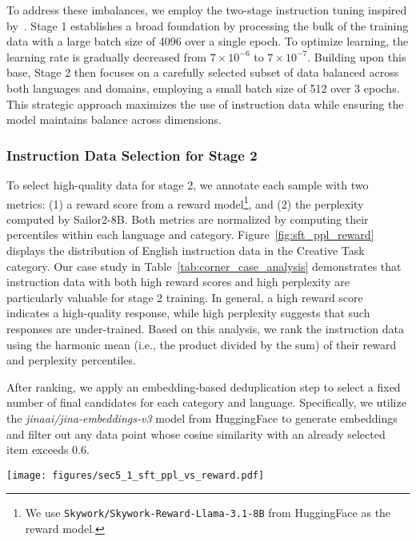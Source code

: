 To address these imbalances, we employ the two-stage instruction tuning inspired by~\cite{Huang2024OpenCoderTO}. 
Stage 1 establishes a broad foundation by processing the bulk of the training data with a large batch size of 4096 over a single epoch. 
To optimize learning, the learning rate is gradually decreased from $7 \times 10^{-6}$ to $7 \times 10^{-7}$.
Building upon this base, Stage 2 then focuses on a carefully selected subset of data balanced across both languages and domains, employing a small batch size of 512 over 3 epochs. 
This strategic approach maximizes the use of instruction data while ensuring the model maintains balance across dimensions.


\subsubsection{Instruction Data Selection for Stage 2}
To select high-quality data for stage 2, we annotate each sample with two metrics: (1) a reward score from a reward model\footnote{We use \texttt{Skywork/Skywork-Reward-Llama-3.1-8B} from HuggingFace as the reward model.}, and (2) the perplexity computed by Sailor2-8B. 
Both metrics are normalized by computing their percentiles within each language and category. Figure~\ref{fig:sft_ppl_reward} displays the distribution of English instruction data in the Creative Task category. Our case study in Table~\ref{tab:corner_case_analysis} demonstrates that instruction data with both high reward scores and high perplexity are particularly valuable for stage 2 training. 
In general, a high reward score indicates a high-quality response, while high perplexity suggests that such responses are under-trained. Based on this analysis, we rank the instruction data using the harmonic mean (i.e., the product divided by the sum) of their reward and perplexity percentiles.

After ranking, we apply an embedding-based deduplication step to select a fixed number of final candidates for each category and language. Specifically, we utilize the \textit{jinaai/jina-embeddings-v3} model from HuggingFace to generate embeddings and filter out any data point whose cosine similarity with an already selected item exceeds 0.6.





\begin{figure*}
\centering
\begin{minipage}[b]{\textwidth}
\centering
\texttt{[image: figures/sec5\_1\_sft\_ppl\_vs\_reward.pdf]}
\end{minipage}
\label{fig:sft_ppl_reward}
\end{figure*}

